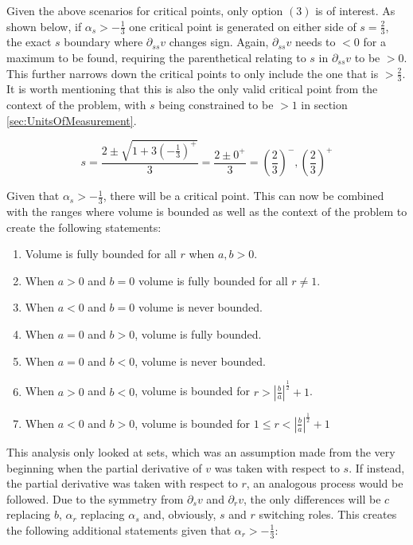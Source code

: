 Given the above scenarios for critical points, only option $(3)$ is of interest. As shown below, if $\alpha_s> -\frac{1}{3}$ one critical point is generated on either side of $s=\frac{2}{3}$, the exact $s$ boundary where $\partial_{ss} v$ changes sign. Again, $\partial_{ss} v$ needs to $<0$ for a maximum to be found, requiring the parenthetical relating to $s$ in $\partial_{ss} v$ to be $>0$. This further narrows down the critical points to only include the one that is $>\frac{2}{3}$. It is worth mentioning that this is also the only valid critical point from the context of the problem, with $s$ being constrained to be $>1$ in section \ref{sec:UnitsOfMeasurement}.

\begin{equation*}
    s=\frac{2\pm \sqrt{1+3\left( -\frac{1}{3} \right)^+}}{3}=\frac{2\pm 0^+}{3}=\left( \frac{2}{3} \right)^-, \left( \frac{2}{3} \right)^+
\end{equation*}

Given that $\alpha_s>-\frac{1}{3}$, there will be a critical point. This can now be combined with the ranges where volume is bounded as well as the context of the problem to create the following statements:

\begin{enumerate}
    \item Volume is fully bounded for all $r$ when $a,b>0$.
    \item When $a>0$ and $b=0$ volume is fully bounded for all $r\ne 1$.
    \item When $a<0$ and $b=0$ volume is never bounded.
    \item When $a=0$ and $b>0$, volume is fully bounded.
    \item When $a=0$ and $b<0$, volume is never bounded.
    \item When $a>0$ and $b<0$, volume is bounded for $r>\left| \frac{b}{a} \right|^\frac{1}{2}+1$.
    \item When $a<0$ and $b>0$, volume is bounded for $1\le r < \left| \frac{b}{a} \right|^\frac{1}{2}+1$
\end{enumerate}

This analysis only looked at sets, which was an assumption made from the very beginning when the partial derivative of $v$ was taken with respect to $s$. If instead, the partial derivative was taken with respect to $r$, an analogous process would be followed. Due to the symmetry from $\partial_sv$ and $\partial_rv$, the only differences will be $c$ replacing $b$, $\alpha_r$ replacing $\alpha_s$ and, obviously, $s$ and $r$ switching roles. This creates the following additional statements given that $\alpha_r>-\frac{1}{3}$:

